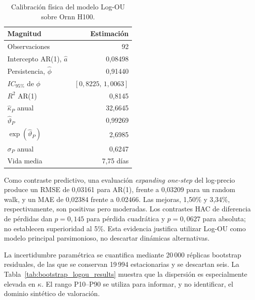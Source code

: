 \begin{table}[htbp]
    \centering
    \caption{Calibración física del modelo Log-OU sobre Ornn H100.}
    \label{tab:logou_calibration_results}
    \begin{tabular}{lr}
        \toprule
        Magnitud & Estimación \\
        \midrule
        Observaciones & 92 \\
        Intercepto AR(1), $\widehat a$ & 0{,}08498 \\
        Persistencia, $\widehat\phi$ & 0{,}91440 \\
        $IC_{95\%}$ de $\phi$ & $[0{,}8225,\,1{,}0063]$ \\
        $R^2$ AR(1) & 0{,}8145 \\
        $\widehat\kappa_P$ anual & 32{,}6645 \\
        $\widehat\vartheta_P$ & 0{,}99269 \\
        $\exp(\widehat\vartheta_P)$ & 2{,}6985 \\
        $\widehat\sigma_P$ anual & 0{,}6247 \\
        Vida media & 7{,}75 días \\
        \bottomrule
    \end{tabular}
\end{table}

Como contraste predictivo, una evaluación \textit{expanding one-step} del log-precio
produce un RMSE de 0{,}03161 para AR(1), frente a 0{,}03209 para un random walk, y un
MAE de 0{,}02384 frente a 0.02466. Las mejoras, 1{,}50\% y 3{,}34\%,
respectivamente, son positivas pero moderadas. Los contrastes HAC de diferencia de pérdidas dan $p=0{,}145$ para pérdida cuadrática
y $p=0{,}0627$ para absoluta; no establecen superioridad al 5\%.
Esta evidencia justifica utilizar Log-OU
como modelo principal parsimonioso, no descartar dinámicas alternativas.

La incertidumbre paramétrica se cuantifica mediante 20\,000 réplicas bootstrap
residuales, de las que se conservan 19\,994 estacionarias y se descartan seis.
La Tabla~\ref{tab:bootstrap_logou_results} muestra que la dispersión es
especialmente elevada en $\kappa$. El rango P10--P90 se utiliza para informar, y no
identificar, el dominio sintético de valoración.

